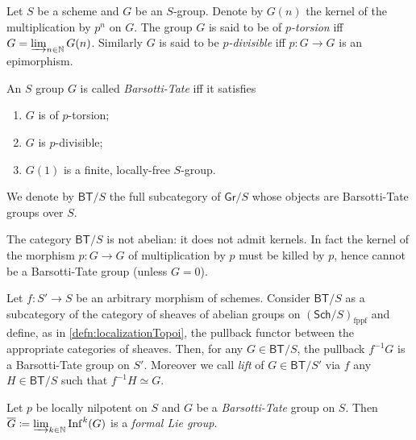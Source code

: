 \begin{defn}
	Let $S$ be a scheme and $G$ be an $S$-group.
	Denote by $G(n)$ the kernel of the multiplication by $p^n$ on $G$.
	The group $G$ is said to be of \emph{$p$-torsion} iff $G = \varinjlim_{n \in \mathbb{N}} G(n)$.
	Similarly $G$ is said to be \emph{$p$-divisible} iff $p\colon G \to G$
	is an epimorphism.
\end{defn}


\begin{defn}\label{BTGroup}
	An $S$ group $G$ is called \emph{Barsotti-Tate} iff it satisfies
\begin{enumerate}
	\item $G$ is of $p$-torsion;
	\item $G$ is $p$-divisible;
	\item $G(1)$ is a finite, locally-free $S$-group.
\end{enumerate}
	We denote by $\mathsf{BT}/S$ the full subcategory of $\mathsf{Gr}/S$
	whose objects are Barsotti-Tate groups over $S$.
\end{defn}


\begin{rem}[]
	The category $\mathsf{BT}/S$ is not abelian:
	it does not admit kernels.
	In fact the kernel of the morphism $p\colon G \to G$
	of multiplication by $p$ must be killed by $p$, hence cannot be
	a Barsotti-Tate group (unless $G=0$).
\end{rem}


\begin{rem}
	Let $f\colon S' \to S$ be an arbitrary morphism of schemes.
	Consider $\mathsf{BT}/S$ as a subcategory of the category of
	sheaves of abelian groups on $\left( \mathsf{Sch}/S  \right)_{\mathrm{fppf}}$
	and define, as in \cref{defn:localizationTopoi}, the pullback
	functor between the appropriate categories of sheaves.
	Then, for any $G \in \mathsf{BT}/S$, the pullback $f^{-1} G$
	is a Barsotti-Tate group on $S'$.
	Moreover we call \emph{lift} of $G \in \mathsf{BT}/S'$ via $f$ any 
	$H \in \mathsf{BT}/S$ such that $f^{-1}H \simeq G$.
\end{rem}


\begin{lem}
	Let $p$ be locally nilpotent on $S$ and $G$ be a \emph{Barsotti-Tate} group on $S$.
	Then
	$\overline{G} \coloneqq \varinjlim_{k \in \mathbb{N}} \mathrm{Inf}^k(G)$
	is a \emph{formal Lie group}.
\end{lem}


